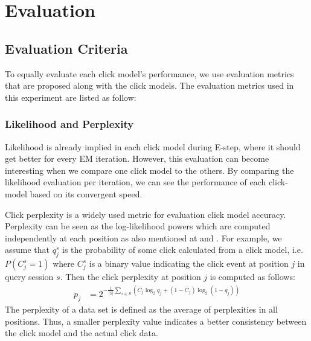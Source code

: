 \section{Evaluation}
\label{sec:evaluation}

\subsection{Evaluation Criteria}
To equally evaluate each click model's performance, we use evaluation metrics that are proposed along with the click models. The evaluation metrics used in this experiment are listed as follow:

\subsubsection{Likelihood and Perplexity}
Likelihood is already implied in each click model during E-step, where it should get better for every EM iteration. 
However, this evaluation can become interesting when we compare one click model to the others. 
By comparing the likelihood evaluation per iteration, we can see the performance of each click-model based on its convergent speed. 

Click perplexity is a widely used metric for evaluation click model accuracy.
Perplexity can be seen as the log-likelihood powers which are computed independently at each position as also mentioned at \cite{Zhang2011} and \cite{Dupret2008}. 
For example, we assume that $q_j^s$ is the probability of some click calculated from a click model, i.e. $P(C_j^s=1)$ where $C_j^s$ is a binary value indicating the click event at position $j$ in query session $s$. Then the click perplexity at position $j$ is computed as follows:
\begin{align*}
	p_j 
	&= 2^{-\frac{1}{|S|} \sum_{s \in S}(C_j \log_2 q_j + (1-C_j) \log_2 (1-q_j))}
\end{align*}
The perplexity of a data set is defined as the average of perplexities in all positions.
Thus, a smaller perplexity value indicates a better consistency between the click model and the actual click data.

